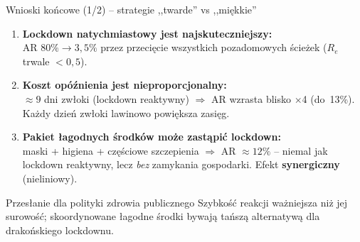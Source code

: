 \documentclass[aspectratio=1610, polish]{beamer}
\begin{document}
\begin{frame}{Wnioski końcowe (1/2) -- strategie ,,twarde'' vs ,,miękkie''}
  \begin{enumerate}
    \item \textbf{Lockdown natychmiastowy jest najskuteczniejszy:}\\
          AR $80\% \to 3{,}5\%$ przez przecięcie wszystkich pozadomowych
          ścieżek ($R_e$ trwale $<0{,}5$).

    \vspace{0.3cm}
    \item \textbf{Koszt opóźnienia jest nieproporcjonalny:}\\
          $\approx 9$ dni zwłoki (lockdown reaktywny) $\Rightarrow$ AR wzrasta
          blisko $\times$4 (do~13\%). Każdy dzień zwłoki lawinowo powiększa zasięg.

    \vspace{0.3cm}
    \item \textbf{Pakiet łagodnych środków może zastąpić lockdown:}\\
          maski + higiena + częściowe szczepienia $\Rightarrow$ AR $\approx 12\%$
          -- niemal jak lockdown reaktywny, lecz \emph{bez} zamykania gospodarki.
          Efekt \textbf{synergiczny} (nieliniowy).
  \end{enumerate}

  \vspace{0.3cm}
  \begin{alertblock}{Przesłanie dla polityki zdrowia publicznego}
    Szybkość reakcji ważniejsza niż jej surowość; skoordynowane łagodne
    środki bywają tańszą alternatywą dla drakońskiego lockdownu.
  \end{alertblock}
\end{frame}
\end{document}

